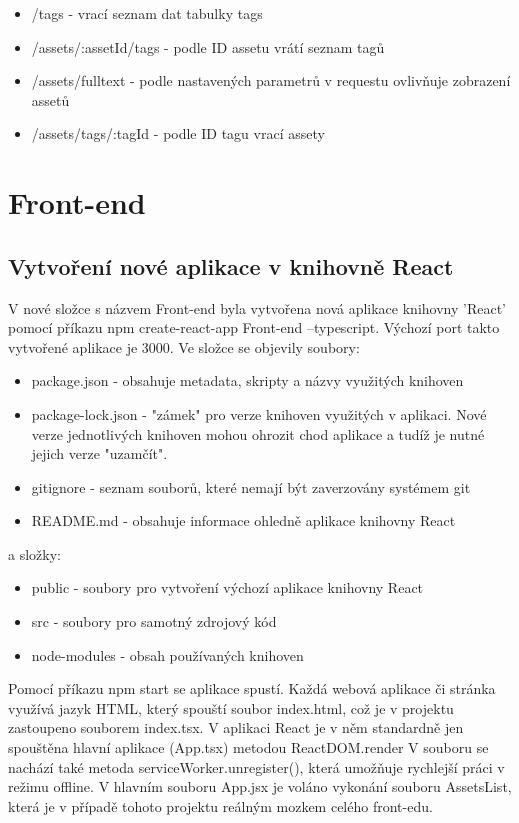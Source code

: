 \begin{itemize}
\item /tags - vrací seznam dat tabulky tags
\item /assets/:assetId/tags - podle ID assetu vrátí seznam tagů
\item /assets/fulltext - podle nastavených parametrů v requestu ovlivňuje zobrazení assetů
\item /assets/tags/:tagId - podle ID tagu vrací assety
 \end{itemize}

\section{Front-end}
\subsection{Vytvoření nové aplikace v knihovně React}
V nové složce s názvem Front-end byla vytvořena nová aplikace knihovny 'React' pomocí příkazu npm create-react-app Front-end --typescript. Výchozí port takto vytvořené aplikace je 3000. Ve složce se objevily soubory:

\begin{itemize}
\item package.json - obsahuje metadata, skripty a názvy využitých knihoven
\item package-lock.json - "zámek" pro verze knihoven využitých v aplikaci. Nové verze jednotlivých knihoven mohou ohrozit chod aplikace a tudíž je nutné jejich verze "uzamčít".
\item gitignore - seznam souborů, které nemají být zaverzovány systémem git
\item README.md - obsahuje informace ohledně aplikace knihovny React
\end{itemize}

a složky:
\begin{itemize}
\item public - soubory pro vytvoření výchozí aplikace knihovny React %
\item src - soubory pro samotný zdrojový kód %
\item node-modules - obsah používaných knihoven
\end{itemize}

Pomocí příkazu npm start se aplikace spustí. Každá webová aplikace či stránka využívá jazyk HTML, který spouští soubor index.html, což je v projektu zastoupeno souborem index.tsx. V aplikaci React je v něm standardně jen spouštěna hlavní aplikace (App.tsx) metodou ReactDOM.render %
V souboru se nachází také metoda serviceWorker.unregister(), která umožňuje rychlejší práci v režimu offline. V hlavním souboru App.jsx je voláno vykonání souboru AssetsList, která je v případě tohoto projektu reálným mozkem celého front-edu.

